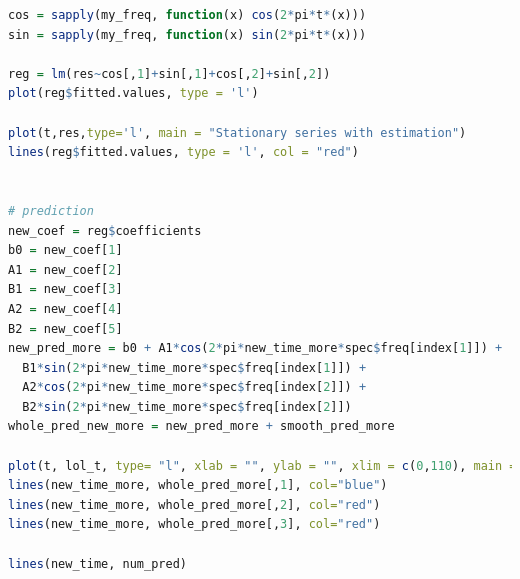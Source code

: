 \documentclass[11pt,a4paper]{article}
\begin{document}
\begin{itemize}
\begin{lstlisting}[language=R]
cos = sapply(my_freq, function(x) cos(2*pi*t*(x)))
sin = sapply(my_freq, function(x) sin(2*pi*t*(x)))

reg = lm(res~cos[,1]+sin[,1]+cos[,2]+sin[,2])
plot(reg$fitted.values, type = 'l')

plot(t,res,type='l', main = "Stationary series with estimation")
lines(reg$fitted.values, type = 'l', col = "red")


# prediction
new_coef = reg$coefficients
b0 = new_coef[1]
A1 = new_coef[2]
B1 = new_coef[3]
A2 = new_coef[4]
B2 = new_coef[5]
new_pred_more = b0 + A1*cos(2*pi*new_time_more*spec$freq[index[1]]) +
  B1*sin(2*pi*new_time_more*spec$freq[index[1]]) +
  A2*cos(2*pi*new_time_more*spec$freq[index[2]]) +
  B2*sin(2*pi*new_time_more*spec$freq[index[2]])
whole_pred_new_more = new_pred_more + smooth_pred_more

plot(t, lol_t, type= "l", xlab = "", ylab = "", xlim = c(0,110), main = "further Prediction")
lines(new_time_more, whole_pred_more[,1], col="blue")
lines(new_time_more, whole_pred_more[,2], col="red")
lines(new_time_more, whole_pred_more[,3], col="red")

lines(new_time, num_pred)



\end{lstlisting}
\end{itemize}
\end{document}
